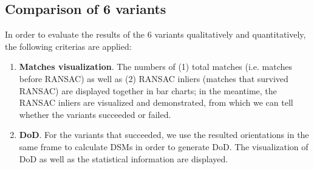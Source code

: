 \subsection{Comparison of 6 variants}
\label{Comparisonof6variants}
In order to evaluate the results of the 6 variants qualitatively and quantitatively, the following criterias are applied:\\
\begin{enumerate}
    \item \textbf{Matches visualization}. The numbers of (1) total matches (i.e. matches before RANSAC) as well as (2) RANSAC inliers (matches that survived RANSAC) are displayed together in bar charts; in the meantime, the RANSAC inliers are visualized and demonstrated, from which we can tell whether the variants succeeded or failed.
    \item \textbf{\ac{DoD}}. For the variants that succeeded, we use the resulted orientations in the same frame to calculate DSMs in order to generate \ac{DoD}. The visualization of \ac{DoD} as well as the statistical information are displayed.
\end{enumerate}

